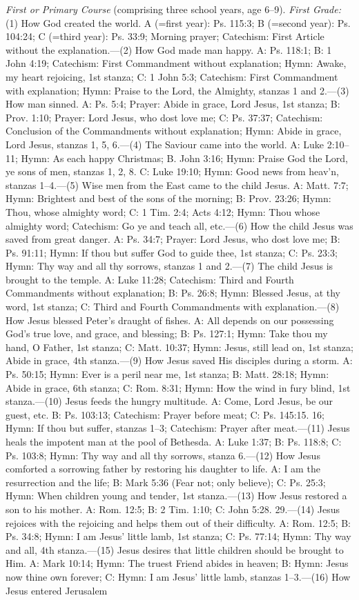 \emph{First or Primary Course} (comprising three school years, age 6–9). \emph{First Grade:} (1) How God created the world. A (=first year): Ps. 115:3; B (=second year): Ps. 104:24; C (=third year): Ps. 33:9; Morning prayer; Catechism: First Article without the explanation.—(2) How God made man happy. A: Ps. 118:1; B: 1 John 4:19; Catechism: First Commandment without explanation; Hymn: Awake, my heart rejoicing, 1st stanza; C: 1 John 5:3; Catechism: First Commandment with explanation; Hymn: Praise to the Lord, the Almighty, stanzas 1 and 2.—(3) How man sinned. A: Ps. 5:4; Prayer: Abide in grace, Lord Jesus, 1st stanza; B: Prov. 1:10; Prayer: Lord Jesus, who dost love me; C: Ps. 37:37; Catechism: Conclusion of the Commandments without explanation; Hymn: Abide in grace, Lord Jesus, stanzas 1, 5, 6.—(4) The Saviour
came into the world. A: Luke 2:10–11; Hymn: As each happy Christmas; B. John 3:16; Hymn: Praise God the Lord, ye sons of men, stanzas 1, 2, 8. C: Luke 19:10; Hymn: Good news from heav'n, stanzas 1–4.—(5) Wise men from the East came to the child Jesus. A: Matt. 7:7; Hymn: Brightest and best of the sons of the morning; B: Prov. 23:26; Hymn: Thou, whose almighty word; C: 1 Tim. 2:4; Acts 4:12; Hymn: Thou whose almighty word; Catechism: Go ye and teach all, etc.—(6) How the child Jesus was saved from great danger. A: Ps. 34:7; Prayer: Lord Jesus, who dost love me; B: Ps. 91:11; Hymn: If thou but suffer God to guide thee, 1st stanza; C: Ps. 23:3; Hymn: Thy way and all thy sorrows, stanzas 1 and 2.—(7) The child Jesus is brought to the temple. A: Luke 11:28; Catechism: Third and Fourth Commandments without explanation; B: Ps. 26:8; Hymn: Blessed Jesus, at thy word, 1st stanza; C: Third and Fourth Commandments with explanation.—(8) How Jesus blessed Peter’s draught of fishes. A: All depends on our possessing God’s true love, and grace, and blessing; B: Ps. 127:1; Hymn: Take thou my hand, O Father, 1st stanza; C: Matt. 10:37; Hymn: Jesus, still lead on, 1st stanza; Abide in grace, 4th stanza.—(9) How Jesus saved His disciples during a storm. A: Ps. 50:15; Hymn: Ever is a peril near me, 1st stanza; B: Matt. 28:18; Hymn: Abide in grace, 6th stanza; C: Rom. 8:31; Hymn: How the wind in fury blind, 1st stanza.—(10) Jesus feeds the hungry multitude. A: Come, Lord Jesus, be our guest, etc. B: Ps. 103:13; Catechism: Prayer before meat; C: Ps. 145:15. 16; Hymn: If thou but suffer, stanzas 1–3; Catechism: Prayer after meat.—(11) Jesus heals the impotent man at the pool of Bethesda. A: Luke 1:37; B: Ps. 118:8; C: Ps. 103:8; Hymn: Thy way and all thy sorrows, stanza 6.—(12) How Jesus comforted a sorrowing father by restoring his daughter to life. A: I am the resurrection and the life; B: Mark 5:36 (Fear not; only believe); C: Ps. 25:3; Hymn: When children young and tender, 1st stanza.—(13) How Jesus restored a son to his mother. A: Rom. 12:5; B: 2 Tim. 1:10; C: John 5:28. 29.—(14) Jesus rejoices with the rejoicing and helps them out of their difficulty. A: Rom. 12:5; B: Ps. 34:8; Hymn: I am Jesus’ little lamb, 1st stanza; C: Ps. 77:14; Hymn: Thy way and all, 4th stanza.—(15) Jesus desires that little children should be brought to Him. A: Mark 10:14; Hymn: The truest Friend abides in heaven; B: Hymn: Jesus now thine own forever; C: Hymn: I am Jesus’ little lamb, stanzas 1–3.—(16) How Jesus entered Jerusalem
